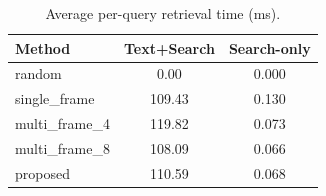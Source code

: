 \begin{table}[h!]
\centering
\caption{Average per-query retrieval time (ms).}
\label{tab:time}
\begin{tabular}{l c c}
\toprule
Method & Text+Search & Search-only \\
\midrule
random & 0.00 & 0.000 \\
single_frame & 109.43 & 0.130 \\
multi_frame_4 & 119.82 & 0.073 \\
multi_frame_8 & 108.09 & 0.066 \\
proposed & 110.59 & 0.068 \\
\bottomrule
\end{tabular}
\end{table}